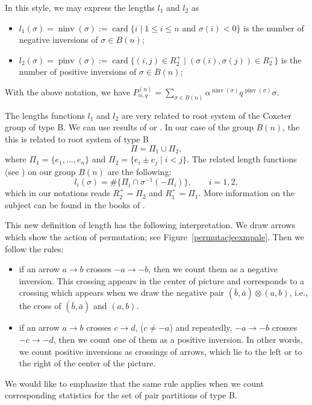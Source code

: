 \documentclass[pdftex]{sigma}
\numberwithin{equation}{section}
\newcommand{\q}{q}
\newcommand{\s}{\alpha}%
\begin{document}
In this style, we may express the lengths $l_1$ and $l_2$ as
\begin{itemize}\itemsep=0pt
\item $l_1(\sigma)=\operatorname{ninv}(\sigma):=\operatorname{card}\{i\mid 1\leq i \leq n\text{ and } \sigma(i )<0 \}$ is the number of negative inversions of $\sigma\in B(n)$;
\item $l_2(\sigma)=\operatorname{pinv}(\sigma):=\operatorname{card}\{(i,j)\in R_2^+\mid (\sigma(i),\sigma(j))\in R_2^- \}$ is the number of positive inversions of $\sigma\in B(n)$;
\end{itemize}
With the above notation, we have
$P_{\s,\q}^{(n)}= \sum_{\sigma \in B(n)}\s^{\operatorname{ninv}(\sigma)} \q^{\operatorname{pinv}(\sigma)} \sigma$.
\begin{Remark}

The lengths functions $l_1$ and $l_2$ are very related to root system
of the Coxeter group of type B.
We can use results of \cite[Proposition~1]{BozejkoSzwarc2003}
or \cite[Chapter~4.3]{Bourbaki}.
In our case of the group $B(n)$, the this is related to root system of
type B
\[
\Pi=\Pi_1\cup \Pi_2,
\]
where $\Pi_1=\{e_1,\dots,e_n\}$ and $\Pi_2=\{e_i\pm e_j\mid i<j\}$.
The related length functions (see \cite[Proposition 1]{BozejkoSzwarc2003}) on our group $B(n)$ are the following:
\[
l_i (\sigma) = \#\big\{ \Pi_i \cap \sigma^{-1} (- \Pi _i )\big\}, \qquad i=1,2,
\]
which
in our notations reads
$R_2^{+}=\Pi_{2}$ and $R_1^{+} = \Pi_{1}$.
More information on the subject can be found in the books of \cite{BjornerBrenti,Humphreys}.
\end{Remark}

This new definition of length has the following interpretation.
We draw arrows which show the action of permutation; see Figure~\ref{permutacjeexmpale}.
Then we follow the rules:
\begin{itemize}\itemsep=0pt
\item if an arrow $a \rightarrow b$ crosses $-a \rightarrow -b$, then we count them as a negative inversion. This crossing appears in the center of picture and corresponds to a crossing which appears when we draw the negative pair $(\bar b,\bar a )\otimes (a,b)$, i.e., the cross of $(\bar b,\bar a )$ and $ (a,b)$.
\item if an arrow $a \rightarrow b$ crosses $c \rightarrow d$, ($c\neq -a$) and repeatedly, $-a \rightarrow -b$ crosses $-c \rightarrow -d$, then we count one of them as a positive inversion. In other words, we count positive inversions as crossings of arrows, which lie to the left or to the right of the center of the picture.
\end{itemize}
We would like to emphasize that the same rule applies when we count corresponding statistics for the set of pair partitions of type B.
\end{document}
